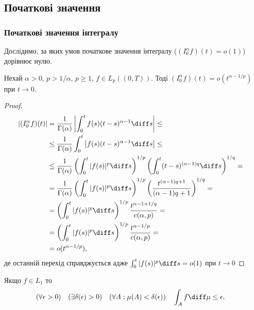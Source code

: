
\subsection{Початкові значення}

\subsubsection{Початкові значення інтегралу}

Дослідимо, за яких умов початкове значення інтегралу ($(I_0^\alpha f)(t) = o(1)$) дорівнює нулю.

\begin{theorem}
    Нехай $\alpha > 0$, $p > 1 / \alpha$, $p \ge 1$, $f \in L_p((0, T))$. Тоді $(I_0^\alpha f) (t) = o(t^{\alpha - 1 / p})$ при $t \to 0$.
\end{theorem}

\begin{proof}
    \begin{align*}
        \left| (I_0^\alpha f) (t) \right| &= \frac{1}{\Gamma(\alpha)} \left| \int_0^t f(s) (t - s)^{\alpha - 1} \diff s \right| \le \\
        &\le \frac{1}{\Gamma(\alpha)}  \int_0^t \left| f(s) (t - s)^{\alpha - 1} \diff s \right| \le \\
        &\le \frac{1}{\Gamma(\alpha)} \left( \int_0^t |f(s)|^p \diff s \right)^{1/p} \left( \int_0^t (t - s)^{(\alpha - 1) q} \diff s \right)^{1/q} = \\
        &= \frac{1}{\Gamma(\alpha)} \left( \int_0^t |f(s)|^p \diff s \right)^{1/p} \left( \frac{t^{(\alpha - 1) q + 1}}{(\alpha - 1) q + 1} \right)^{1 / q} = \\
        &= \left( \int_0^t |f(s)|^p \diff s \right)^{1/p} \frac{t^{\alpha - 1 + 1 / q}}{c(\alpha, p)} = \\
        &= \left( \int_0^t |f(s)|^p \diff s \right)^{1/p} \frac{t^{\alpha - 1 / p}}{c(\alpha, p)} = \\
        &= o(t^{\alpha - 1 / p}),
    \end{align*}
    де останній перехід справджується адже $\int_0^t |f(s)|^p \diff s = o(1)$ при $t \to 0$
\end{proof}

\begin{remark}
    Якщо $f \in L_1$ то
    \begin{equation}
        (\forall \epsilon > 0) \quad (\exists \delta(\epsilon) > 0) \quad (\forall A: \mu(A) < \delta(\epsilon)) \quad \int_A f \diff \mu \le \epsilon.
    \end{equation}
\end{remark}

